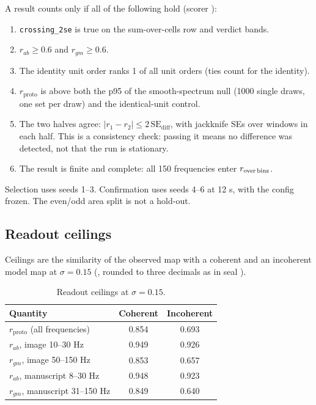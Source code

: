 A result counts only if all of the following hold (scorer ):
\begin{enumerate}
\item \texttt{crossing\_2se} is true on the sum-over-cells row and verdict bands.
\item $r_{ab} \geq 0.6$ and $r_{gm} \geq 0.6$.
\item The identity unit order ranks 1 of all unit orders (ties count for the identity).
\item $r_\text{proto}$ is above both the p95 of the smooth-spectrum null (1000 single draws, one set per draw) and the identical-unit control.
\item The two halves agree: $|r_1 - r_2| \leq 2\,\text{SE}_\text{diff}$, with jackknife SEs over windows in each half. This is
a consistency check: passing it means no difference was detected, not that the run is stationary.
\item The result is finite and complete: all 150 frequencies enter $r_\text{over\,bins}$.
\end{enumerate}
Selection uses seeds 1--3. Confirmation uses seeds 4--6 at 12 s, with the config frozen. The even/odd area split
is not a hold-out.

\subsection{Readout ceilings}

Ceilings are the similarity of the observed map with a coherent and an incoherent model map at $\sigma = 0.15$
(, rounded to three decimals as in seal ).

\begin{table}[tbp]
\centering
\begin{tabular}{lcc}
\toprule
Quantity & Coherent & Incoherent \\
\midrule
$r_\text{proto}$ (all frequencies) & 0.854 & 0.693 \\
$r_{ab}$, image 10--30 Hz & 0.949 & 0.926 \\
$r_{gm}$, image 50--150 Hz & 0.853 & 0.657 \\
$r_{ab}$, manuscript 8--30 Hz & 0.948 & 0.923 \\
$r_{gm}$, manuscript 31--150 Hz & 0.849 & 0.640 \\
\bottomrule
\end{tabular}
\caption{Readout ceilings at $\sigma = 0.15$.}
\end{table}

